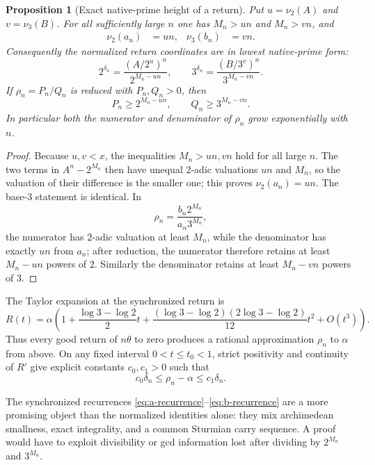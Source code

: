 \documentclass[11pt]{article}
\newtheorem{proposition}[theorem]{Proposition}
\theoremstyle{definition}
\theoremstyle{remark}
\begin{document}
\begin{proposition}[Exact native-prime height of a return]\label{prop:return-height}
Put $u=\nu_2(A)$ and $v=\nu_3(B)$. For all sufficiently large $n$ one has $M_n>un$ and $M_n>vn$, and
\begin{align}
 \nu_2(a_n)&=un, &
 \nu_3(b_n)&=vn.\label{eq:native-gap-valuations}
\end{align}
Consequently the normalized return coordinates are in lowest native-prime form:
\[
 2^{\delta_n}=\frac{(A/2^u)^n}{2^{M_n-un}},
 \qquad
 3^{\delta_n}=\frac{(B/3^v)^n}{3^{M_n-vn}}.
\]
If $\rho_n=P_n/Q_n$ is reduced with $P_n,Q_n>0$, then
\begin{equation}\label{eq:rho-height-lower}
 P_n\ge2^{M_n-un},\qquad Q_n\ge3^{M_n-vn}.
\end{equation}
In particular both the numerator and denominator of $\rho_n$ grow exponentially with $n$.
\end{proposition}

\begin{proof}
Because $u,v<x$, the inequalities $M_n>un,vn$ hold for all large $n$. The two terms in $A^n-2^{M_n}$ then have unequal $2$-adic valuations $un$ and $M_n$, so the valuation of their difference is the smaller one; this proves $\nu_2(a_n)=un$. The base-$3$ statement is identical. In
\[
 \rho_n=\frac{b_n2^{M_n}}{a_n3^{M_n}},
\]
the numerator has $2$-adic valuation at least $M_n$, while the denominator has exactly $un$ from $a_n$; after reduction, the numerator therefore retains at least $M_n-un$ powers of $2$. Similarly the denominator retains at least $M_n-vn$ powers of $3$.
\end{proof}

The Taylor expansion at the synchronized return is
\begin{equation}\label{eq:R-taylor}
 R(t)=\alpha\left(
 1+\frac{\log3-\log2}{2}t
 +\frac{(\log3-\log2)(2\log3-\log2)}{12}t^2
 +O(t^3)
 \right).
\end{equation}
Thus every good return of $n\theta$ to zero produces a rational approximation $\rho_n$ to $\alpha$ from above. On any fixed interval $0<t\le t_0<1$, strict positivity and continuity of $R'$ give explicit constants $c_0,c_1>0$ such that
\begin{equation}\label{eq:R-comparable}
 c_0\delta_n\le \rho_n-\alpha\le c_1\delta_n.
\end{equation}

The synchronized recurrences \eqref{eq:a-recurrence}--\eqref{eq:b-recurrence} are a more promising object than the normalized identities alone: they mix archimedean smallness, exact integrality, and a common Sturmian carry sequence. A proof would have to exploit divisibility or gcd information lost after dividing by $2^{M_n}$ and $3^{M_n}$.
\end{document}
